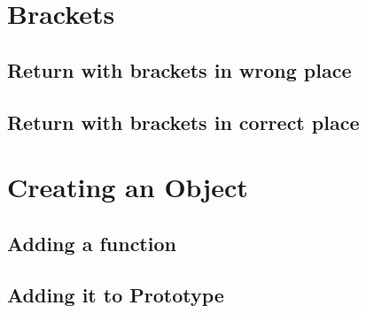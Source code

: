 \documentclass {amsart}
\begin{document}
	
\section{Brackets}
	\subsection{Return with brackets in wrong place}
	\subsection{Return with brackets in correct place}

\section{Creating an Object}
	\subsection{Adding a function}
	\subsection{Adding it to Prototype}
\end{document}
